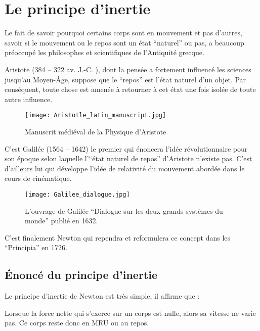 \chapter{Le principe d'inertie}
Le fait de savoir pourquoi certains corps sont en mouvement et pas d'autres, savoir si le mouvement ou le repos sont un état \enquote{naturel} ou pas, a beaucoup préoccupé les philosophes et scientifiques de l'Antiquité grecque.

Aristote (384 -- 322 av. J.-C. ), dont la pensée a fortement influencé les sciences jusqu'au Moyen-Âge, suppose que le \enquote{repos} est l'état naturel d'un objet. Par conséquent, toute chose est amenée à retourner à cet état une fois isolée de toute autre influence.

\begin{figure}[h!]
    \centering
    \texttt{[image: Aristotle\_latin\_manuscript.jpg]}
    \caption{Manuscrit médiéval de la Physique d'Aristote}
    \label{Aristotle_latin_manuscript}
\end{figure}

\newpage

C'est Galilée (1564 -- 1642) le premier qui énoncera l'idée révolutionnaire pour son époque selon laquelle l'\enquote{état naturel de repos} d'Aristote n'existe pas. C'est d'ailleurs lui qui développe l'idée de relativité du mouvement abordée dans le cours de cinématique.

\begin{figure}[h!]
    \centering
    \texttt{[image: Galilee\_dialogue.jpg]}
    \caption{L'ouvrage de Galilée \enquote{Dialogue sur les deux grands systèmes du monde} publié en 1632.}
    \label{Galilee_dialogue}
\end{figure}

C'est finalement Newton qui rependra et reformulera ce concept dans les \enquote{Principia} en 1726.

\newpage



\section{Énoncé du principe d'inertie}
Le principe d'inertie de Newton est très simple, il affirme que :
\begin{encadre}
    Lorsque la force nette qui s'exerce sur un corps est nulle, alors sa vitesse ne varie pas. Ce corps reste donc en MRU ou au repos.
\end{encadre}

